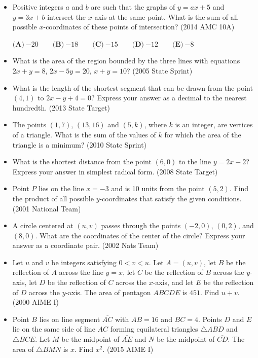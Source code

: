 \documentclass{article}
\begin{document}
\begin{itemize}
\item Positive integers $a$ and $b$ are such that the graphs of $y=ax+5$ and $y=3x+b$ intersect the $x$-axis at the same point. What is the sum of all possible $x$-coordinates of these points of intersection? (2014 AMC 10A)

$ \textbf{(A)}\ {-20}\qquad\textbf{(B)}\ {-18}\qquad\textbf{(C)}\ {-15}\qquad\textbf{(D)}\ {-12}\qquad\textbf{(E)}\ {-8} $

\item What is the area of the region bounded by the three lines with equations $2x+y=8$, $2x-5y=20$, $x+y=10$? (2005 State Sprint)

\item What is the length of the shortest segment that can be drawn from the point $(4,1)$ to $2x-y+4=0$? Express your answer as a decimal to the nearest hundredth. (2013 State Target)

\item The points $(1,7)$, $(13, 16)$ and $(5,k)$, where $k$ is an integer, are vertices of a triangle. What is the sum of the values of $k$ for which the area of the triangle is a minimum? (2010 State Sprint)

\item What is the shortest distance from the point $(6,0)$ to the line $y=2x-2$? Express your answer in simplest radical form. (2008 State Target)

\item Point $P$ lies on the line $x=-3$ and is 10 units from the point $(5,2)$. Find the product of all possible $y$-coordinates that satisfy the given conditions. (2001 National Team)

\item A circle centered at $(u,v)$ passes through the points $(-2,0)$, $(0,2)$, and $(8,0)$. What are the coordinates of the center of the circle? Express your answer as a coordinate pair. (2002 Nats Team)

\item Let $u$ and $v$ be integers satisfying $0<v<u$. Let $A=(u,v)$, let $B$ be the reflection of $A$ across the line $y=x$, let $C$ be the reflection of $B$ across the $y$-axis, let $D$ be the reflection of $C$ across the $x$-axis, and let $E$ be the reflection of $D$ across the $y$-axis. The area of pentagon $ABCDE$ is $451$. Find $u+v$. (2000 AIME I)

\item Point $B$ lies on line segment $\overline{AC}$ with $AB=16$ and $BC=4$. Points $D$ and $E$ lie on the same side of line $AC$ forming equilateral triangles $\triangle ABD$ and $\triangle BCE$. Let $M$ be the midpoint of $\overline{AE}$ and $N$ be the midpoint of $\overline{CD}$. The area of $\triangle BMN$ is $x$. Find $x^2$. (2015 AIME I)


\end{itemize}
\end{document}
